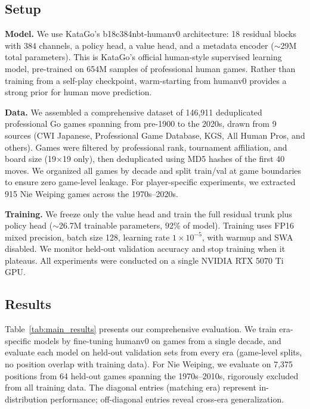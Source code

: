 \documentclass{article}
\begin{document}
\subsection{Setup}

\textbf{Model.} We use KataGo's b18c384nbt-humanv0 architecture: 18 residual blocks with 384 channels, a policy head, a value head, and a metadata encoder (${\sim}$29M total parameters). This is KataGo's official human-style supervised learning model, pre-trained on 654M samples of professional human games. Rather than training from a self-play checkpoint, warm-starting from humanv0 provides a strong prior for human move prediction.

\textbf{Data.} We assembled a comprehensive dataset of 146,911 deduplicated professional Go games spanning from pre-1900 to the 2020s, drawn from 9 sources (CWI Japanese, Professional Game Database, KGS, All Human Pros, and others). Games were filtered by professional rank, tournament affiliation, and board size (19$\times$19 only), then deduplicated using MD5 hashes of the first 40 moves. We organized all games by decade and split train/val at game boundaries to ensure zero game-level leakage. For player-specific experiments, we extracted 915 Nie Weiping games across the 1970s--2020s.

\textbf{Training.} We freeze only the value head and train the full residual trunk plus policy head (${\sim}$26.7M trainable parameters, 92\% of model). Training uses FP16 mixed precision, batch size 128, learning rate $1{\times}10^{-5}$, with warmup and SWA disabled. We monitor held-out validation accuracy and stop training when it plateaus. All experiments were conducted on a single NVIDIA RTX 5070 Ti GPU.

\subsection{Results}

Table~\ref{tab:main_results} presents our comprehensive evaluation. We train era-specific models by fine-tuning humanv0 on games from a single decade, and evaluate each model on held-out validation sets from every era (game-level splits, no position overlap with training data). For Nie Weiping, we evaluate on 7,375 positions from 64 held-out games spanning the 1970s--2010s, rigorously excluded from all training data. The diagonal entries (matching era) represent in-distribution performance; off-diagonal entries reveal cross-era generalization.
\end{document}
